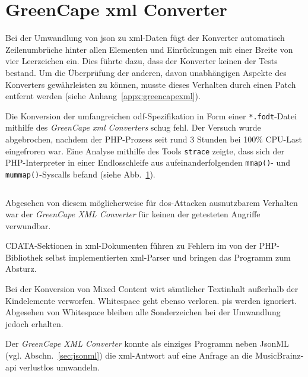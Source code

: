 \section{GreenCape \acrshort{xml} Converter}
\label{sec:greencapexml}

Bei der Umwandlung von \acrshort{json} zu \acrshort{xml}-Daten fügt der Konverter automatisch Zeilenumbrüche hinter allen Elementen und Einrückungen mit einer Breite von vier Leerzeichen ein. Dies führte dazu, dass der Konverter keinen der Tests bestand. Um die Überprüfung der anderen, davon unabhängigen Aspekte des Konverters gewährleisten zu können, musste dieses Verhalten durch einen Patch entfernt werden (siehe Anhang~\ref{appx:greencapexml}).

Die Konversion der umfangreichen \acrshort{odf}-Spezifikation in Form einer \texttt{*.fodt}-Datei mithilfe des \emph{GreenCape \acrshort{xml} Converters} schug fehl. Der Versuch wurde abgebrochen, nachdem der PHP-Prozess seit rund 3 Stunden bei 100\% CPU-Last eingefroren war. Eine Analyse mithilfe des Tools \texttt{strace} zeigte, dass sich der PHP-Interpreter in einer Endlosschleife aus aufeinanderfolgenden \texttt{mmap()}- und \texttt{mummap()}-Syscalls befand (siehe Abb.~\ref{fig:greencapeloop}).

\begin{figure}[h!]
    \inputminted{shell-session}{greencapexml-strace.txt}
    \label{fig:greencapeloop}
\end{figure}

Abgesehen von diesem möglicherweise für \acrshort{dos}-Attacken ausnutzbarem Verhalten war der \emph{GreenCape XML Converter} für keinen der getesteten Angriffe verwundbar.

CDATA-Sektionen in \acrshort{xml}-Dokumenten führen zu Fehlern im von der PHP-Bibliothek selbst implementierten \acrshort{xml}-Parser und bringen das Programm zum Absturz.

Bei der Konversion von Mixed Content wirt sämtlicher Textinhalt außerhalb der Kindelemente verworfen. Whitespace geht ebenso verloren. \glspl{pi} werden ignoriert. Abgesehen von Whitespace bleiben alle Sonderzeichen bei der Umwandlung jedoch erhalten.

Der \emph{GreenCape XML Converter} konnte als einziges Programm neben \acrshort{JsonML} (vgl. Abschn.~\ref{sec:jsonml}) die \acrshort{xml}-Antwort auf eine Anfrage an die MusicBrainz-\acrshort{api} verlustlos umwandeln.


